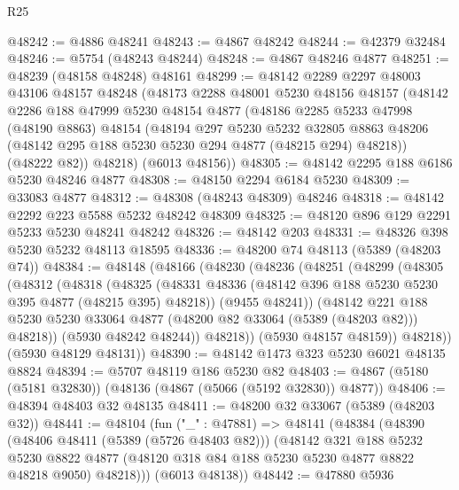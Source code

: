 \begin{lexlean}{R25}
\begin{coremodule}
@48242 := @4886 @48241
@48243 := @4867 @48242
@48244 := @42379 @32484
@48246 := @5754 (@48243 @48244)
@48248 := @4867 @48246 @4877
@48251 := @48239 (@48158 @48248) @48161
@48299 := @48142
    @2289
    @2297
    @48003
    @43106
    @48157
    @48248
    (@48173
      @2288
      @48001
      @5230
      @48156
      @48157
      (@48142
        @2286
        @188
        @47999
        @5230
        @48154
        @4877
        (@48186
          @2285
          @5233
          @47998
          (@48190 @8863)
          @48154
          (@48194
            @297
            @5230
            @5232
            @32805
            @8863
            @48206
            (@48142 @295 @188 @5230 @5230 @294 @4877 (@48215 @294) @48218))
          (@48222 @82))
        @48218)
      (@6013 @48156))
@48305 := @48142 @2295 @188 @6186 @5230 @48246 @4877
@48308 := @48150 @2294 @6184 @5230
@48309 := @33083 @4877
@48312 := @48308 (@48243 @48309) @48246
@48318 := @48142 @2292 @223 @5588 @5232 @48242 @48309
@48325 := @48120 @896 @129 @2291 @5233 @5230 @48241 @48242
@48326 := @48142 @203
@48331 := @48326 @398 @5230 @5232 @48113 @18595
@48336 := @48200 @74 @48113 (@5389 (@48203 @74))
@48384 := @48148
    (@48166
      (@48230
        (@48236
          (@48251
            (@48299
              (@48305
                (@48312
                  (@48318
                    (@48325
                      (@48331 @48336 (@48142 @396 @188 @5230 @5230 @395 @4877 (@48215 @395) @48218))
                      (@9455 @48241))
                    (@48142
                      @221
                      @188
                      @5230
                      @5230
                      @33064
                      @4877
                      (@48200 @82 @33064 (@5389 (@48203 @82)))
                      @48218))
                  (@5930 @48242 @48244))
                @48218))
            (@5930 @48157 @48159))
          @48218))
      (@5930 @48129 @48131))
@48390 := @48142 @1473 @323 @5230 @6021 @48135 @8824
@48394 := @5707 @48119 @186 @5230 @82
@48403 := @4867 (@5180 (@5181 @32830)) (@48136 (@4867 (@5066 (@5192 @32830)) @4877))
@48406 := @48394 @48403 @32 @48135
@48411 := @48200 @32 @33067 (@5389 (@48203 @32))
@48441 := @48104
    (fun ("_" : @47881) =>
    @48141
      (@48384
        (@48390
          (@48406 @48411 (@5389 (@5726 @48403 @82)))
          (@48142
            @321
            @188
            @5232
            @5230
            @8822
            @4877
            (@48120 @318 @84 @188 @5230 @5230 @4877 @8822 @48218 @9050)
            @48218)))
      (@6013 @48138))
@48442 := @47880 @5936

\end{coremodule}
\end{lexlean}
